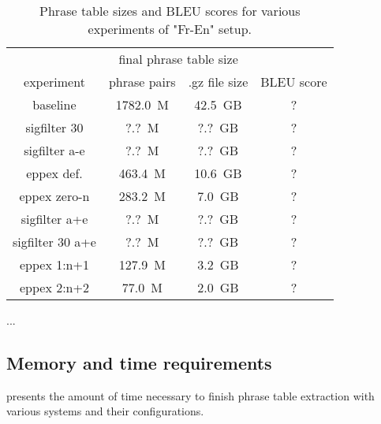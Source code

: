 \begin{table}[ht]
\centering
\begin{tabular}{ | c | c c | c | }
\hline
 & \multicolumn{2}{|c|}{final phrase table size} & \\
experiment & phrase pairs & .gz file size & BLEU score \\
\hline
\hline
baseline          & 1782.0~M & 42.5~GB & ? \\ %
sigfilter 30      &    ?.?~M &  ?.?~GB & ? \\ %
sigfilter a-e     &    ?.?~M &  ?.?~GB & ? \\ %
eppex def.        &  463.4~M & 10.6~GB & ? \\ %
eppex zero-n      &  283.2~M &  7.0~GB & ? \\ %
sigfilter a+e     &    ?.?~M &  ?.?~GB & ? \\ %
sigfilter 30 a+e  &    ?.?~M &  ?.?~GB & ? \\ %
eppex 1:n+1       &  127.9~M &  3.2~GB & ? \\ %
eppex 2:n+2       &   77.0~M &  2.0~GB & ? \\ %
\hline
\end{tabular}
\caption{\label{fr-en-pt-size-and-bleu}
Phrase table sizes and BLEU scores for various experiments of "Fr-En" setup.}
\end{table}

...

\subsection{Memory and time requirements}

 presents the amount of time necessary to finish
phrase table extraction with various systems and their configurations.

